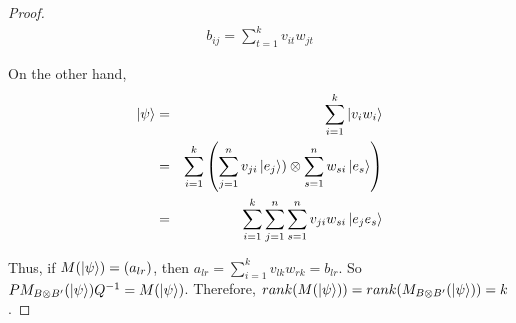 \begin{proof}
\begin{comment}
=\begin{pmatrix}
\ket{v_1} && \ket{v_2} && \hdots && \ket{v_n}
\end{pmatrix}
\begin{pmatrix}
\text{---} && \ket{w_1}^T &&\text{---} \\
\text{---} && \ket{w_2}^T &&\text{---} \\
\vdots && \vdots && \vdots \\
\text{---} && \ket{w_k}^T &&\text{---} \\
\text{---} && 0 &&\text{---}
\end{pmatrix}\\
=\begin{pmatrix}
v_{11}w_{11}+\hdots+v_{1k}w_{1k} && v_{11}w_{21}+\hdots+v_{1k}w_{2k} && \hdots && v_{11}w_{n1}+\hdots+v_{1k}w_{nk}\\
v_{21}w_{11}+\hdots+v_{2k}w_{1k} && v_{21}w_{21}+\hdots+v_{2k}w_{2k} && \hdots && v_{21}w_{n1}+\hdots+v_{2k}w_{nk}\\
\vdots && \vdots && \vdots && \vdots\\
v_{n1}w_{11}+\hdots+v_{nk}w_{1k} && v_{n1}w_{21}+\hdots+v_{nk}w_{2k} && \hdots && v_{n1}w_{n1}+\hdots+v_{nk}w_{nk}
\end{pmatrix}

\end{comment}
\begin{gather*}
    b_{ij}=\sum_{t=1}^k v_{it}w_{jt}
\end{gather*}


On the other hand,
\begin{eqnarray*}
\ket{\psi}&=&\sum_{i=1}^k \ket{v_i w_i}\\
&=&\sum_{i=1}^k \left(\sum_{j=1}^{n} v_{ji} \ket{e_j}) \otimes \sum_{s=1}^n w_{si}\ket{e_s}\right)\\
&=&\sum_{i=1}^k \sum_{j=1}^{n} \sum_{s=1}^n v_{ji} w_{si} \ket{e_j e_s}\\
\end{eqnarray*}

\noindent
Thus, if $M(\ket{\psi})=(a_{lr})$, then $a_{lr}=\sum_{i=1}^k v_{lk} w_{rk}=b_{lr}$.
So $PM_{B \otimes B'}(\ket{\psi})Q^{-1}=M(\ket{\psi})$.  Therefore, $rank(M(\ket{\psi}))=rank(M_{B \otimes B'}(\ket{\psi}))=k$.
\end{proof}

